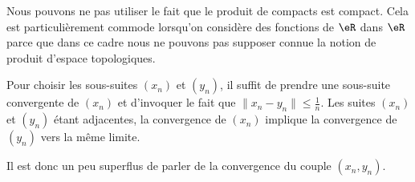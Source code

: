 \begin{remark}
    Nous pouvons ne pas utiliser le fait que le produit de compacts est compact. Cela est particulièrement commode lorsqu'on considère des fonctions de \( \eR\) dans \( \eR\) parce que dans ce cadre nous ne pouvons pas supposer connue la notion de produit d'espace topologiques.

    Pour choisir les sous-suites \( (x_n)\) et \( (y_n)\), il suffit de prendre une sous-suite convergente de \( (x_n)\) et d'invoquer le fait que \( \| x_n-y_n \|\leq \frac{1}{ n }\). Les suites \( (x_n)\) et \( (y_n)\) étant adjacentes, la convergence de \( (x_n)\) implique la convergence de \( (y_n)\) vers la même limite.

    Il est donc un peu superflus de parler de la convergence du couple \( (x_n,y_n)\).
\end{remark}
